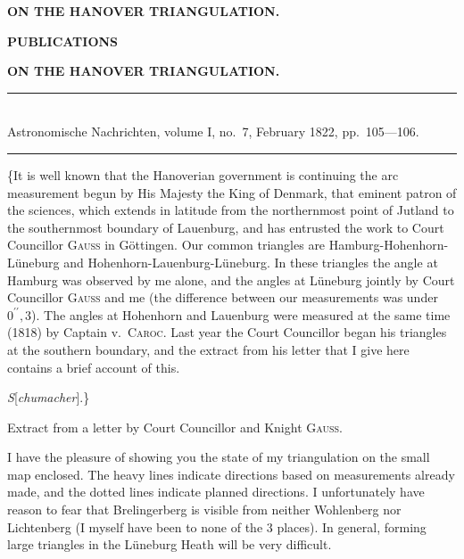 \clearpage
\noindent{}\hfill{\small\textbf{ON THE HANOVER TRIANGULATION.}}\hfill\null\par\medskip
\begin{center}
{\large\textbf{PUBLICATIONS}}\par\bigskip
{\large\textbf{ON THE HANOVER TRIANGULATION.}}\par\medskip
[II.]\par\bigskip
\rule{.74\linewidth}{.4pt}\\[-.5ex]
{\small Astronomische Nachrichten, volume I, no.~7, February 1822, pp.~105---106.}\\[-.5ex]
\rule{.74\linewidth}{.4pt}
\end{center}
\par\noindent\hspace*{\parindent}\{It is well known that the Hanoverian government is continuing the arc measurement begun by His Majesty the King of Denmark, that eminent patron of the sciences, which extends in latitude from the northernmost point of Jutland to the southernmost boundary of Lauenburg, and has entrusted the work to Court Councillor \textsc{Gauss} in Göttingen. Our common triangles are Hamburg-Hohenhorn-Lüneburg and Hohenhorn-Lauenburg-Lüneburg. In these triangles the angle at Hamburg was observed by me alone, and the angles at Lüneburg jointly by Court Councillor \textsc{Gauss} and me (the difference between our measurements was under \(0^{\prime\prime}{,}3\)). The angles at Hohenhorn and Lauenburg were measured at the same time (1818) by Captain v.~\textsc{Caroc}. Last year the Court Councillor began his triangles at the southern boundary, and the extract from his letter that I give here contains a brief account of this.
\par\noindent\hfill\textit{S}[\textit{chumacher}].\}\par
\begin{center}Extract from a letter by Court Councillor and Knight \textsc{Gauss}.\end{center}
\par\noindent\hspace*{\parindent}I have the pleasure of showing you the state of my triangulation on the small map enclosed. The heavy lines indicate directions based on measurements already made, and the dotted lines indicate planned directions. I unfortunately have reason to fear that Brelingerberg is visible from neither Wohlenberg nor Lichtenberg (I myself have been to none of the 3 places). In general, forming large triangles in the Lüneburg Heath will be very difficult.

